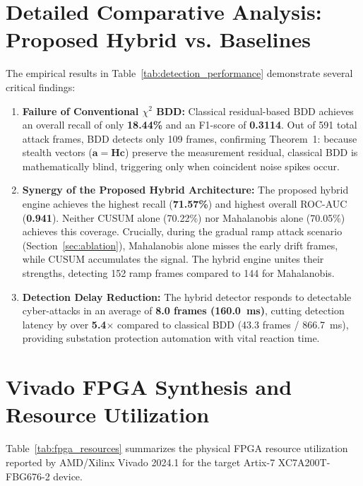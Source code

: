 \documentclass[11pt,a4paper]{report}
\begin{document}
\section{Detailed Comparative Analysis: Proposed Hybrid vs. Baselines}
The empirical results in Table~\ref{tab:detection_performance} demonstrate several critical findings:
\begin{enumerate}
    \item \textbf{Failure of Conventional $\chi^2$ BDD:} Classical residual-based BDD achieves
    an overall recall of only \textbf{18.44\%} and an F1-score of \textbf{0.3114}. Out of 591
    total attack frames, BDD detects only 109 frames, confirming Theorem~1: because stealth
    vectors ($\boldsymbol{a} = \boldsymbol{H}\boldsymbol{c}$) preserve the measurement residual,
    classical BDD is mathematically blind, triggering only when coincident noise spikes occur.
    \item \textbf{Synergy of the Proposed Hybrid Architecture:} The proposed hybrid engine
    achieves the highest recall (\textbf{71.57\%}) and highest overall ROC-AUC (\textbf{0.941}).
    Neither CUSUM alone (70.22\%) nor Mahalanobis alone (70.05\%) achieves this coverage.
    Crucially, during the gradual ramp attack scenario (Section~\ref{sec:ablation}), Mahalanobis
    alone misses the early drift frames, while CUSUM accumulates the signal. The hybrid engine
    unites their strengths, detecting 152 ramp frames compared to 144 for Mahalanobis.
    \item \textbf{Detection Delay Reduction:} The hybrid detector responds to detectable
    cyber-attacks in an average of \textbf{8.0 frames (160.0~ms)}, cutting detection latency
    by over \textbf{5.4$\times$} compared to classical BDD (43.3 frames / 866.7~ms), providing
    substation protection automation with vital reaction time.
\end{enumerate}

\section{Vivado FPGA Synthesis and Resource Utilization}
Table~\ref{tab:fpga_resources} summarizes the physical FPGA resource utilization reported
by AMD/Xilinx Vivado 2024.1 for the target Artix-7 XC7A200T-FBG676-2 device.
\end{document}
